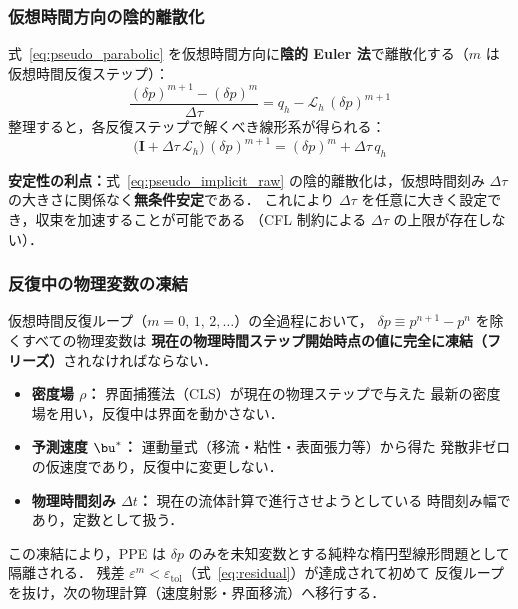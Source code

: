 \subsubsection{仮想時間方向の陰的離散化}
\label{sec:pseudo_implicit}

式~\eqref{eq:pseudo_parabolic} を仮想時間方向に\textbf{陰的 Euler 法}で離散化する（$m$ は仮想時間反復ステップ）：
\begin{equation}
  \frac{(\delta p)^{m+1} - (\delta p)^m}{\Delta\tau} = q_h - \mathcal{L}_h\,(\delta p)^{m+1}
  \label{eq:pseudo_implicit_raw}
\end{equation}
整理すると，各反復ステップで解くべき線形系が得られる：
\begin{equation}
  \bigl(\mathbf{I} + \Delta\tau\,\mathcal{L}_h\bigr)\,(\delta p)^{m+1}
  = (\delta p)^m + \Delta\tau\, q_h
  \label{eq:pseudo_linear}
\end{equation}

\textbf{安定性の利点：}式~\eqref{eq:pseudo_implicit_raw} の陰的離散化は，仮想時間刻み $\Delta\tau$ の大きさに関係なく\textbf{無条件安定}である．
これにより $\Delta\tau$ を任意に大きく設定でき，収束を加速することが可能である
（CFL 制約による $\Delta\tau$ の上限が存在しない）．

\subsubsection{反復中の物理変数の凍結}
\label{sec:pseudo_variable_freeze}

仮想時間反復ループ（$m = 0,\,1,\,2,\ldots$）の全過程において，
$\delta p \equiv p^{n+1}-p^n$ を除くすべての物理変数は
\textbf{現在の物理時間ステップ開始時点の値に完全に凍結（フリーズ）}されなければならない．
\begin{itemize}
  \item \textbf{密度場 $\rho$：} 界面捕獲法（CLS）が現在の物理ステップで与えた
        最新の密度場を用い，反復中は界面を動かさない．
  \item \textbf{予測速度 $\bu^*$：} 運動量式（移流・粘性・表面張力等）から得た
        発散非ゼロの仮速度であり，反復中に変更しない．
  \item \textbf{物理時間刻み $\Delta t$：} 現在の流体計算で進行させようとしている
        時間刻み幅であり，定数として扱う．
\end{itemize}
この凍結により，PPE は $\delta p$ のみを未知変数とする純粋な楕円型線形問題として隔離される．
残差 $\varepsilon^m < \varepsilon_\mathrm{tol}$（式~\eqref{eq:residual}）が達成されて初めて
反復ループを抜け，次の物理計算（速度射影・界面移流）へ移行する．

